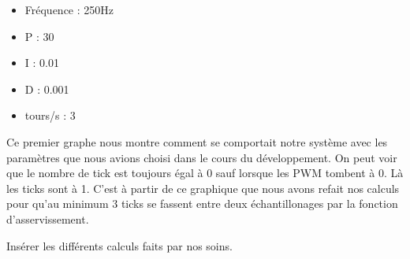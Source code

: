 \documentclass[
	a4paper,									%
	11pt,										%
	twoside,									%
	openright,									%
	notitlepage,									%
	parskip=half,								%
]{scrreprt}										%
\begin{document}
\begin{center}
    



\begin{itemize}
    \item Fréquence : 250Hz
    \item P : 30
    \item I : 0.01
    \item D : 0.001
    \item tours/s : 3
\end{itemize}
\end{center}

Ce premier graphe nous montre comment se comportait notre système avec les paramètres que nous avions choisi dans le cours 
du développement. On peut voir que le nombre de tick est toujours égal à 0 sauf lorsque les PWM tombent à 0. Là les ticks sont
à 1. C'est à partir de ce graphique que nous avons refait nos calculs pour qu'au minimum 3 ticks se fassent entre deux 
échantillonages par la fonction d'asservissement. \par

Insérer les différents calculs faits par nos soins. \par
\end{document}

